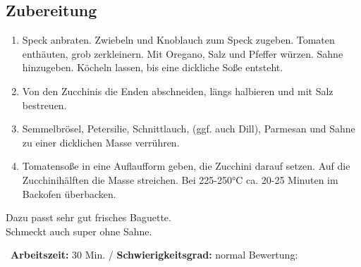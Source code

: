 \begin{minipage}[t]{0.58\textwidth}
\vspace{0pt}
\subsection*{Zubereitung}
\begin{enumerate}[leftmargin=*, itemindent=14pt]
\item Speck anbraten. Zwiebeln und Knoblauch zum Speck zugeben. Tomaten enthäuten, grob zerkleinern. Mit Oregano, Salz und Pfeffer würzen. Sahne hinzugeben. Köcheln lassen, bis eine dickliche Soße entsteht.
\item Von den Zucchinis die Enden abschneiden, längs halbieren und mit Salz bestreuen.

\item Semmelbrösel, Petersilie, Schnittlauch, (ggf. auch Dill), Parmesan und Sahne zu einer dicklichen Masse verrühren.

\item Tomatensoße in eine Auflaufform geben, die Zucchini darauf setzen. Auf die Zucchinihälften die Masse streichen. Bei 225-250°C ca. 20-25 Minuten im Backofen überbacken.
\end{enumerate}
Dazu passt sehr gut frisches Baguette.\\
Schmeckt auch super ohne Sahne.
\end{minipage}
\vfill
\decothreeright \, \textbf{Arbeitszeit:} 30 Min. / \textbf{Schwierigkeitsgrad:} normal \decothreeleft \hfill Bewertung:  \CIRCLE \CIRCLE \CIRCLE \CIRCLE  \LEFTcircle